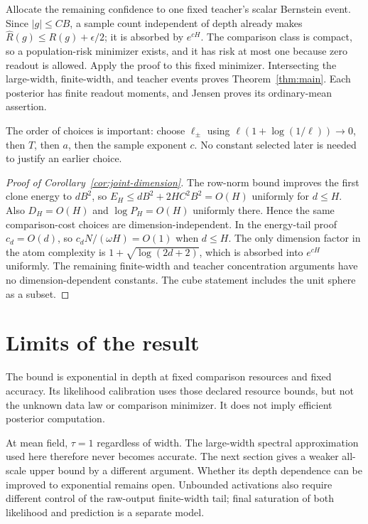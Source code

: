 \documentclass[11pt]{article}
\begin{document}
Allocate the remaining confidence to one fixed teacher's scalar Bernstein event. Since $|g|\le CB$, a sample count independent of depth already makes $\widehat R(g)\le R(g)+\epsilon/2$; it is absorbed by $e^{cH}$. The comparison class is compact, so a population-risk minimizer exists, and it has risk at most one because zero readout is allowed. Apply the proof to this fixed minimizer. Intersecting the large-width, finite-width, and teacher events proves Theorem~\ref{thm:main}. Each posterior has finite readout moments, and Jensen proves its ordinary-mean assertion.

The order of choices is important: choose $\ell_\pm$ using $\ell(1+\log(1/\ell))\to0$, then $T$, then $a$, then the sample exponent $c$. No constant selected later is needed to justify an earlier choice.

\begin{proof}[Proof of Corollary~\ref{cor:joint-dimension}]
The row-norm bound improves the first clone energy to $dB^2$, so $E_H\le dB^2+2HC^2B^2=O(H)$ uniformly for $d\le H$. Also $D_H=O(H)$ and $\log P_H=O(H)$ uniformly there. Hence the same comparison-cost choices are dimension-independent. In the energy-tail proof $c_d=O(d)$, so $c_dN/(\omega H)=O(1)$ when $d\le H$. The only dimension factor in the atom complexity is $1+\sqrt{\log(2d+2)}$, which is absorbed into $e^{cH}$ uniformly. The remaining finite-width and teacher concentration arguments have no dimension-dependent constants. The cube statement includes the unit sphere as a subset.
\end{proof}

\section{Limits of the result}
The bound is exponential in depth at fixed comparison resources and fixed accuracy. Its likelihood calibration uses those declared resource bounds, but not the unknown data law or comparison minimizer. It does not imply efficient posterior computation.

At mean field, $\tau=1$ regardless of width. The large-width spectral approximation used here therefore never becomes accurate. The next section gives a weaker all-scale upper bound by a different argument. Whether its depth dependence can be improved to exponential remains open. Unbounded activations also require different control of the raw-output finite-width tail; final saturation of both likelihood and prediction is a separate model.
\end{document}
